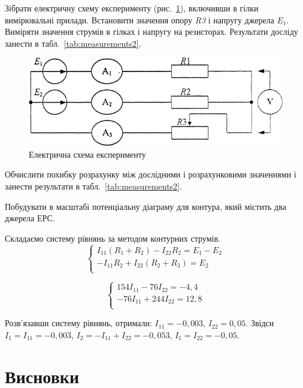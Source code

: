 \documentclass[a4paper,oneside,DIV=10,12pt]{scrartcl}
\newcommand\schel[1]{\textit{#1}}
\begin{document}
			Зібрати електричну схему експерименту (рис.~\ref{fig:schematic02}), включивши в гілки вимірювальні прилади. Встановити значення опору \schel{R3} і напругу джерела \schel{$E_1$}. Виміряти значення струмів в гілках і напругу на резисторах. Результати досліду занести в табл.~\ref{tab:measurements2}.
			
			\begin{figure}[!htbp]
				\centering
				\includegraphics[width=\textwidth]{schematic-02.png}
				\caption{Електрична схема експерименту}
				\label{fig:schematic02}
			\end{figure}
			
			Обчислити похибку розрахунку між дослідними і розрахунковими значеннями і занести результати в табл.~\ref{tab:measurements2}.
			
			Побудувати в масштабі потенціальну діаграму для контура, який містить два джерела ЕРС.
			
			Складаємо систему рівнянь за методом контурних струмів.
			\[
				\begin{cases}
					 I_{11} (R_1 + R_2) - I_{22}  R_2        = E_1 - E_2\\
					-I_{11} R_2         + I_{22} (R_2 + R_3) = E_2\\
				\end{cases}
			\]
			
			\[
				\begin{cases}
					 154 I_{11} -  76 I_{22} = -4{,}4\\
					-76  I_{11} + 244 I_{22} = 12{,}8\\
				\end{cases}
			\]
			
			Розв'язавши систему рівнянь, отримали: $I_{11} = -0{,}003$, $I_{22} = 0{,}05$. Звідси $I_1 = I_{11} = -0{,}003$, $I_2 = -I_{11} + I_{22} = -0{,}053$, $I_1 = I_{22} = -0{,}05$.
		
	\section{Висновки}
		
\end{document}
